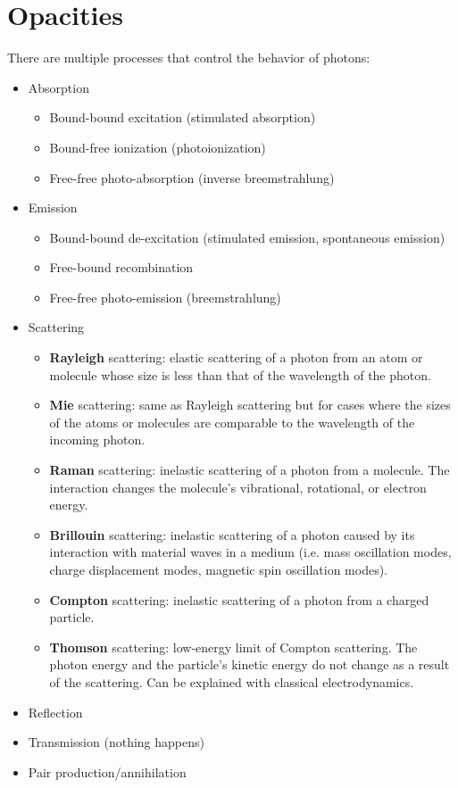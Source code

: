 \documentclass[a4paper,11pt]{article}
\begin{document}
\section{Opacities}
There are multiple processes that control the behavior of photons:
\begin{itemize}
    \item Absorption 
    \begin{itemize}
        \item Bound-bound excitation (stimulated absorption)
        \item Bound-free ionization (photoionization)
        \item Free-free photo-absorption (inverse breemstrahlung)
    \end{itemize}
    \item Emission 
    \begin{itemize}
        \item Bound-bound de-excitation (stimulated emission, spontaneous emission)
        \item Free-bound recombination
        \item Free-free photo-emission (breemstrahlung)
    \end{itemize}
    \item Scattering
    \begin{itemize}
        \item \textbf{Rayleigh} scattering: elastic scattering of a photon from an atom or molecule whose size is less than that of the wavelength of the photon. 
        \item \textbf{Mie} scattering: same as Rayleigh scattering but for cases where the sizes of the atoms or molecules are comparable to the wavelength of the incoming photon.
        \item \textbf{Raman} scattering: inelastic scattering of a photon from a molecule. The interaction changes the molecule's vibrational, rotational, or electron energy.
        \item \textbf{Brillouin} scattering: inelastic scattering of a photon caused by its interaction with material waves in a medium (i.e. mass oscillation modes, charge displacement modes, magnetic spin oscillation modes). 
        \item \textbf{Compton} scattering: inelastic scattering of a photon from a charged particle. 
        \item \textbf{Thomson} scattering: low-energy limit of Compton scattering. The photon energy and the particle's kinetic energy do not change as a result of the scattering. Can be explained with classical electrodynamics.
    \end{itemize}
    \item Reflection
    \item Transmission (nothing happens)
    \item Pair production/annihilation
\end{itemize}
\end{document}
